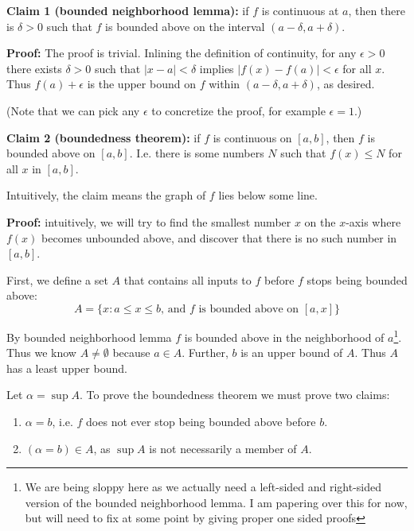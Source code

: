 \vs

\textbf{Claim 1 (bounded neighborhood lemma):} if $f$ is continuous at $a$, then there is $\delta>0$
such that $f$ is bounded above on the interval $(a-\delta, a+\delta)$.

\vs

\textbf{Proof:} The proof is trivial. Inlining the definition of
continuity, for any $\epsilon>0$ there exists $\delta>0$ such that
$|x-a|<\delta$ implies $|f(x)-f(a)|<\epsilon$ for all $x$. Thus
$f(a)+\epsilon$ is the upper bound on $f$ within $(a-\delta, a+\delta)$, as desired.

\vs

(Note that we can pick any $\epsilon$ to concretize the proof, for example
$\epsilon=1$.)

\vs

\textbf{Claim 2 (boundedness theorem):} if $f$ is continuous on
$[a,b]$, then $f$ is bounded above on $[a,b]$. I.e. there is some
numbers $N$ such that $f(x)\leq N$ for all $x$ in $[a,b]$.

\vs

Intuitively, the claim means the graph of $f$ lies below some line.

\vs

\textbf{Proof:} intuitively, we will try to find the smallest number
$x$ on the $x$-axis where $f(x)$ becomes unbounded above, and discover
that there is no such number in $[a,b]$.

\vs

First, we define a set $A$ that contains all inputs to $f$ before $f$
stops being bounded above:
\[A=\{x:a\leq x\leq b \text{, and $f$ is bounded above on $[a,x]$}\}\]

By bounded neighborhood lemma $f$ is bounded above in the neighborhood
of $a$\footnote{We are being sloppy here as we actually need a
  left-sided and right-sided version of the bounded neighborhood
  lemma. I am papering over this for now, but will need to fix at some
  point by giving proper one sided proofs}. Thus we know
$A\neq\emptyset$ because $a\in A$. Further, $b$ is an upper bound of
$A$. Thus $A$ has a least upper bound.

\vs

Let $\alpha=\sup A$. To prove the boundedness theorem we must prove two
claims:
\begin{enumerate}
\item $\alpha=b$, i.e. $f$ does not ever stop being bounded above before
  $b$.
\item $(\alpha=b)\in A$, as $\sup A$ is not necessarily a member of $A$.
\end{enumerate}

